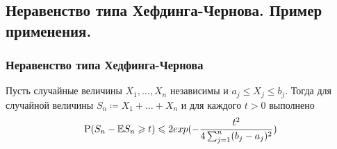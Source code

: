 \subsection{Неравенство типа Хефдинга-Чернова. Пример применения.}

\subsubsection{Неравенство типа Хедфинга-Чернова}
\begin{theorem*}
    Пусть случайные величины $ X_1, \dots, X_n $ независимы и $ a_j \leq X_j \leq b_j. $ Тогда для случайной величины $S_n \coloneq X_1 + \dots + X_n$ и для каждого $t > 0$ выполнено
    \begin{equation*}
        \P(S_n - \mathbb{E}S_n \geq t) \leq 2 exp(-\frac{t^2}{4\sum_{j=1}^{n}(b_j - a_j)^2})
    \end{equation*}
\end{theorem*}

